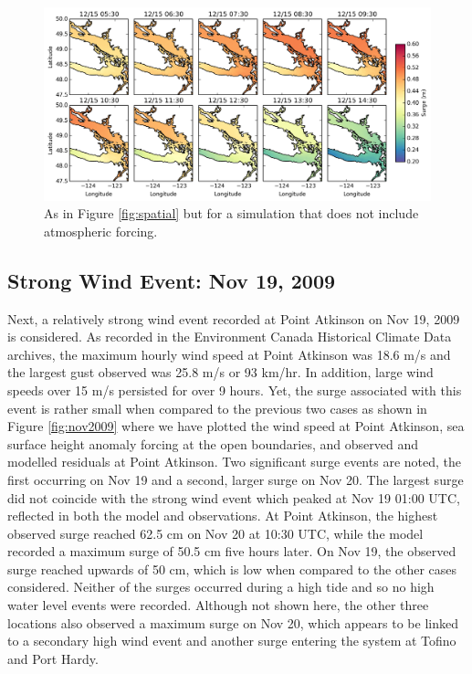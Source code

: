 \documentclass[pdftex,10pt]{article}
\begin{document}
\begin{figure}
\centering
\includegraphics[scale=0.6]{Figures/dec2006_spatial_sshonly.pdf}
\caption{As in Figure \ref{fig:spatial} but for a simulation that does not include atmospheric forcing. }
\label{fig:spatial_sshonly}
\end{figure}

\subsection{Strong Wind Event: Nov 19, 2009}
Next, a relatively strong wind event recorded at Point Atkinson on Nov 19, 2009 is considered. As recorded in the Environment Canada Historical Climate Data archives, the maximum hourly wind speed at Point Atkinson was 18.6 m/s and the largest gust observed was 25.8 m/s or 93 km/hr. In addition, large wind speeds over 15 m/s persisted for over 9 hours. Yet, the surge associated with this event is rather small when compared to the previous two cases as shown in Figure \ref{fig:nov2009} where we have plotted the wind speed at Point Atkinson, sea surface height anomaly forcing at the open boundaries, and observed and modelled residuals at Point Atkinson. Two significant surge events are noted, the first occurring on Nov 19 and a second, larger surge on Nov 20. The largest surge did not coincide with the strong wind event which peaked at Nov 19 01:00 UTC, reflected in both the model and observations. At Point Atkinson, the highest observed surge reached 62.5 cm on Nov 20 at 10:30 UTC, while the model recorded a maximum surge of 50.5 cm five hours later. On Nov 19, the observed surge reached upwards of 50 cm, which is low when compared to the other cases considered. Neither of the surges occurred during a high tide and so no high water level events were recorded. Although not shown here, the other three locations also observed a maximum surge on Nov 20, which appears to be linked to a secondary high wind event and another surge entering the system at Tofino and Port Hardy. 
\end{document}
